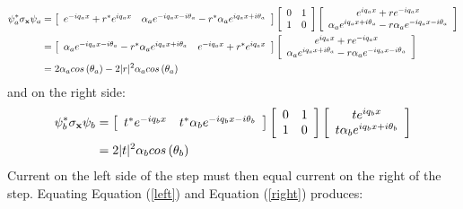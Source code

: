 \documentclass[12pt,a4paper]{article}
\begin{document}
		\begin{align}
			\psi_{a}^{*} {\bf \sigma_{x}} \psi_{a}&=
			\left[\begin{array}{ccc}
				e^{-iq_{a}x}+r^{*}e^{iq_{a}x}&\alpha_{a}e^{-iq_{a}x-i\theta_{a}}-r^{*}\alpha_{a}e^{iq_{a}x+i\theta_{a}}
			\end{array}\right]
			\left[\begin{array}{ccc}
				0&1\\
				1&0
			\end{array}\right]
			\left[\begin{array}{ccc}
				e^{iq_{a}x}+re^{-iq_{a}x}\\
				\alpha_{a}e^{iq_{a}x+i\theta_{a}}-r\alpha_{a}e^{-iq_{a}x-i\theta_{a}}
			\end{array}\right]\\
			&=
			\left[\begin{array}{ccc}
				\alpha_{a}e^{-iq_{a}x-i\theta_{a}}-r^{*}\alpha_{a}e^{iq_{a}x+i\theta_{a}}&e^{-iq_{a}x}+r^{*}e^{iq_{a}x}
			\end{array}\right]
			\left[\begin{array}{ccc}
				e^{iq_{a}x}+re^{-iq_{a}x}\\
				\alpha_{a}e^{iq_{a}x+i\theta_{a}}-r\alpha_{a}e^{-iq_{a}x-i\theta_{a}}
			\end{array}\right]\\
			&=
			2\alpha_{a}cos\left(\theta_{a}\right)-2|r|^{2}\alpha_{a}cos\left(\theta_{a}\right)
			\label{left}
		\end{align}
		and on the right side:
		\begin{align}
			\psi_{b}^{*} {\bf \sigma_{x}} \psi_{b}&=
			\left[\begin{array}{ccc}
				t^{*}e^{-iq_{b}x}&t^{*}\alpha_{b}e^{-iq_{b}x-i\theta_{b}}
			\end{array}\right]
			\left[\begin{array}{ccc}
				0&1\\
				1&0
			\end{array}\right]
			\left[\begin{array}{ccc}
				te^{iq_{b}x}\\
				t\alpha_{b}e^{iq_{b}x+i\theta_{b}}
			\end{array}\right]\\
			&=
			2|t|^{2}\alpha_{b}cos\left(\theta_{b}\right)
			\label{right}
		\end{align}
		Current on the left side of the step must then equal current on the right of the step. Equating Equation (\ref{left}) and Equation (\ref{right}) produces:
\end{document}
